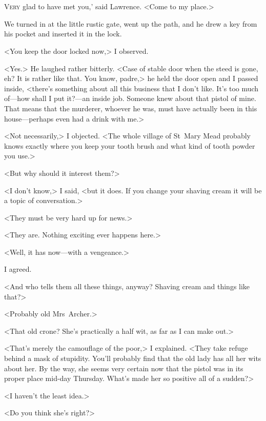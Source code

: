 \chapter[Chapter  \thechapter]{}


\lettrine[ante=`]{V}{ery}  glad to have met you,' said Lawrence. <Come to my place.>

\zz
We turned in at the little rustic gate, went up the path, and he drew a key from his pocket and inserted it in the lock.

\zz
<You keep the door locked now,> I observed.

<Yes.> He laughed rather bitterly. <Case of stable door when the steed is gone, eh? It is rather like that. You know, padre,> he held the door open and I passed inside, <there's something about all this business that I don't like. It's too much of—how shall I put it?—an inside job. Someone knew about that pistol of mine. That means that the murderer, whoever he was, must have actually been in this house—perhaps even had a drink with me.>

<Not necessarily,> I objected. <The whole village of St~Mary Mead probably knows exactly where you keep your tooth brush and what kind of tooth powder you use.>

<But why should it interest them?>

<I don't know,> I said, <but it does. If you change your shaving cream it will be a topic of conversation.>

<They must be very hard up for news.>

<They are. Nothing exciting ever happens here.>

<Well, it has now—with a vengeance.>

I agreed.

<And who tells them all these things, anyway? Shaving cream and things like that?>

<Probably old Mrs~Archer.>

<That old crone? She's practically a half wit, as far as I can make out.>

<That's merely the camouflage of the poor,> I explained. <They take refuge behind a mask of stupidity. You'll probably find that the old lady has all her wits about her. By the way, she seems very certain now that the pistol was in its proper place mid-day Thursday. What's made her so positive all of a sudden?>

<I haven't the least idea.>

<Do you think she's right?>

